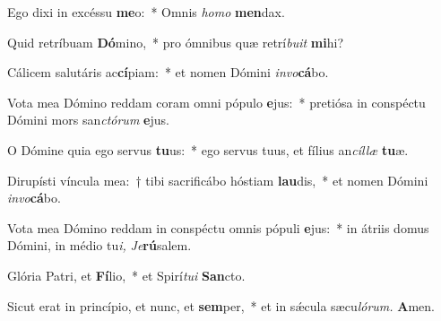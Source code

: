 \item Ego dixi in excéssu \textbf{me}o:~* Omnis \textit{homo} \textbf{men}dax.
\item Quid retríbuam \textbf{Dó}mino,~* pro ómnibus quæ retrí\textit{buit} \textbf{mi}hi?
\item Cálicem salutáris ac\textbf{cí}piam:~* et nomen Dómini \textit{invo}\textbf{cá}bo.
\item Vota mea Dómino reddam coram omni pópulo \textbf{e}jus:~* pretiósa in conspé\-ctu Dómini mors san\textit{ctórum} \textbf{e}jus.
\item O Dómine quia ego servus \textbf{tu}us:~* ego servus tuus, et fílius an\textit{cíllæ} \textbf{tu}æ.
\item Dirupísti víncula mea:~† tibi sacrificábo hóstiam \textbf{lau}dis,~* et nomen Dómini \textit{invo}\textbf{cá}bo.
\item Vota mea Dómino reddam in conspéctu omnis pópuli \textbf{e}jus:~* in átriis domus Dómini, in médio tu\hspace{0.03em}\textit{i,} \hspace{0.02em}\textit{Je}\textbf{rú}salem.
\item Glória Patri, et \textbf{Fí}lio,~* et Spirí\hspace{0.03em}\textit{tui} \textbf{San}cto.
\item Sicut erat in princípio, et nunc, et \textbf{sem}per,~* et in sǽcula sæcu\hspace{0.03em}\textit{lórum.} \textbf{A}men.
